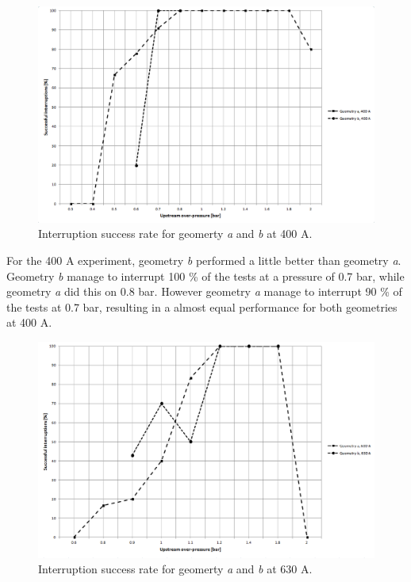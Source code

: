 \documentclass[10pt,a4paper]{article}
\begin{document}
\begin{figure}[H]
\centering
\includegraphics[scale=0.5]{Bilder/Results/successRate400A.png}
\caption{Interruption success rate for geomerty \textit{a} and \textit{b} at 400 A.} \label{fig:successRate400A}
\end{figure}

For the 400 A experiment, geometry \textit{b} performed a little better than geometry \textit{a}. Geometry \textit{b} manage to interrupt 100 \% of the tests at a pressure of 0.7 bar, while geometry \textit{a} did this on 0.8 bar. However geometry \textit{a} manage to interrupt 90 \% of the tests at 0.7 bar, resulting in a almost equal performance for both geometries at 400 A.

\begin{figure}[H]
\centering
\includegraphics[scale=0.5]{Bilder/Results/successRate630A.png}
\caption{Interruption success rate for geomerty \textit{a} and \textit{b} at 630 A.} \label{fig:successRate630A}
\end{figure}
\end{document}

